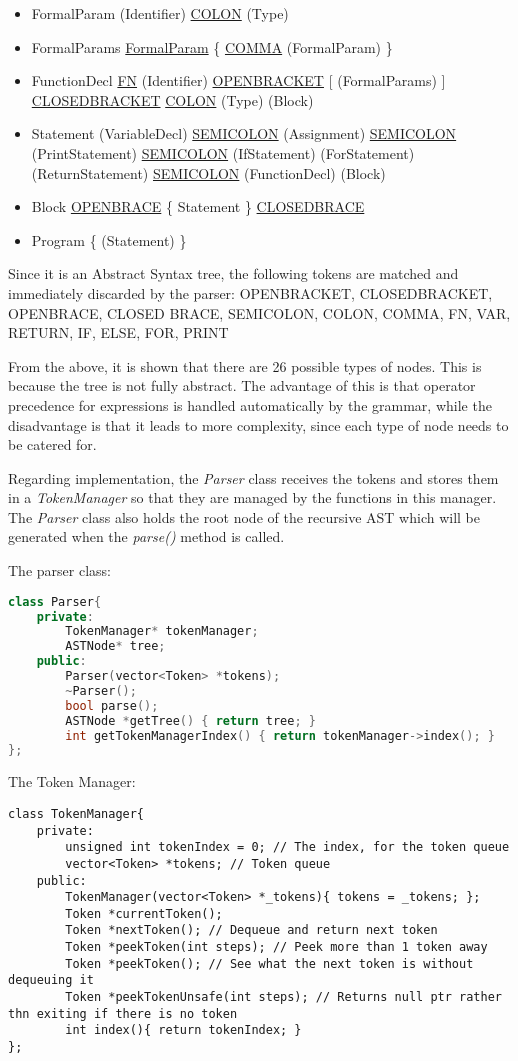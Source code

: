 \begin{itemize}
	\item FormalParam
		\subitem (Identifier) \ul{COLON} (Type)
	\item FormalParams
		\subitem \ul{FormalParam} \{ \ul{COMMA} (FormalParam) \}
	\item FunctionDecl
		\subitem \ul{FN} (Identifier) \ul{OPEN\un BRACKET} [ (FormalParams) ] \ul{CLOSED\un BRACKET} \ul{COLON} (Type) (Block)
	\item Statement
		\subitem (VariableDecl) \ul{SEMI\un COLON}
		\subitem (Assignment) \ul{SEMI\un COLON}
		\subitem (PrintStatement) \ul{SEMI\un COLON}
		\subitem (IfStatement)
		\subitem (ForStatement)
		\subitem (ReturnStatement) \ul{SEMI\un COLON}
		\subitem (FunctionDecl)
		\subitem (Block)
	\item Block
		\subitem \ul{OPEN\un BRACE} \{ Statement \} \ul{CLOSED\un BRACE}
	\item Program
		\subitem \{ (Statement) \}
\end{itemize}

Since it is an Abstract Syntax tree, the following tokens are matched and immediately discarded by the parser: OPEN\un BRACKET, CLOSED\un BRACKET, OPEN\un BRACE, CLOSED \un BRACE, SEMI\un COLON, COLON, COMMA, FN, VAR, RETURN, IF, ELSE, FOR, PRINT

From the above, it is shown that there are 26 possible types of nodes. This is because the tree is not fully abstract. The advantage of this is that operator precedence for expressions is handled automatically by the grammar, while the disadvantage is that it leads to more complexity, since each type of node needs to be catered for.

Regarding implementation, the \textit{Parser} class receives the tokens and stores them in a \textit{TokenManager} so that they are managed by the functions in this manager. The \textit{Parser} class also holds the root node of the recursive AST which will be generated when the \textit{parse()} method is called.


The parser class:
\begin{lstlisting}[language=C++]
class Parser{
	private:
		TokenManager* tokenManager;
		ASTNode* tree;
	public:
		Parser(vector<Token> *tokens);
		~Parser();
		bool parse();
		ASTNode *getTree() { return tree; }
		int getTokenManagerIndex() { return tokenManager->index(); }
};
\end{lstlisting}

The Token Manager:
\begin{lstlisting}
class TokenManager{
	private:
		unsigned int tokenIndex = 0; // The index, for the token queue
		vector<Token> *tokens; // Token queue
	public:
		TokenManager(vector<Token> *_tokens){ tokens = _tokens; };
		Token *currentToken();
		Token *nextToken(); // Dequeue and return next token
		Token *peekToken(int steps); // Peek more than 1 token away
		Token *peekToken(); // See what the next token is without dequeuing it
		Token *peekTokenUnsafe(int steps); // Returns null ptr rather thn exiting if there is no token
		int index(){ return tokenIndex; }
};
\end{lstlisting}


